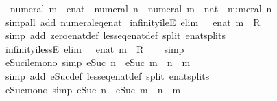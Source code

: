 \begin{isabellebody}
\ \ {\isachardoublequoteopen}{\isacharparenleft}numeral\ m\ {\isacharcolon}{\isacharcolon}\ enat{\isacharparenright}\ {\isacharless}\ numeral\ n\ {\isasymlongleftrightarrow}\ {\isacharparenleft}numeral\ m\ {\isacharcolon}{\isacharcolon}\ nat{\isacharparenright}\ {\isacharless}\ numeral\ n{\isachardoublequoteclose}\isanewline
%
\isadelimproof
\ \ %
\endisadelimproof
%
\isatagproof
{}\isamarkupfalse%
\ {\isacharparenleft}simp{\isacharunderscore}all\ add{\isacharcolon}\ numeral{\isacharunderscore}eq{\isacharunderscore}enat{\isacharparenright}%
\endisatagproof
{\isafoldproof}%
%
\isadelimproof
\isanewline
%
\endisadelimproof
\isanewline
{}\isamarkupfalse%
\ infinity{\isacharunderscore}ileE\ {\isacharbrackleft}elim{\isacharbang}{\isacharbrackright}{\isacharcolon}\ {\isachardoublequoteopen}{\isasyminfinity}\ {\isasymle}\ enat\ m\ {\isasymLongrightarrow}\ R{\isachardoublequoteclose}\isanewline
%
\isadelimproof
\ \ %
\endisadelimproof
%
\isatagproof
{}\isamarkupfalse%
\ {\isacharparenleft}simp\ add{\isacharcolon}\ zero{\isacharunderscore}enat{\isacharunderscore}def\ less{\isacharunderscore}eq{\isacharunderscore}enat{\isacharunderscore}def\ split{\isacharcolon}\ enat{\isachardot}splits{\isacharparenright}%
\endisatagproof
{\isafoldproof}%
%
\isadelimproof
\isanewline
%
\endisadelimproof
\isanewline
{}\isamarkupfalse%
\ infinity{\isacharunderscore}ilessE\ {\isacharbrackleft}elim{\isacharbang}{\isacharbrackright}{\isacharcolon}\ {\isachardoublequoteopen}{\isasyminfinity}\ {\isacharless}\ enat\ m\ {\isasymLongrightarrow}\ R{\isachardoublequoteclose}\isanewline
%
\isadelimproof
\ \ %
\endisadelimproof
%
\isatagproof
{}\isamarkupfalse%
\ simp%
\endisatagproof
{\isafoldproof}%
%
\isadelimproof
\isanewline
%
\endisadelimproof
\isanewline
{}\isamarkupfalse%
\ eSuc{\isacharunderscore}ile{\isacharunderscore}mono\ {\isacharbrackleft}simp{\isacharbrackright}{\isacharcolon}\ {\isachardoublequoteopen}eSuc\ n\ {\isasymle}\ eSuc\ m\ {\isasymlongleftrightarrow}\ n\ {\isasymle}\ m{\isachardoublequoteclose}\isanewline
%
\isadelimproof
\ \ %
\endisadelimproof
%
\isatagproof
{}\isamarkupfalse%
\ {\isacharparenleft}simp\ add{\isacharcolon}\ eSuc{\isacharunderscore}def\ less{\isacharunderscore}eq{\isacharunderscore}enat{\isacharunderscore}def\ split{\isacharcolon}\ enat{\isachardot}splits{\isacharparenright}%
\endisatagproof
{\isafoldproof}%
%
\isadelimproof
\isanewline
%
\endisadelimproof
\isanewline
{}\isamarkupfalse%
\ eSuc{\isacharunderscore}mono\ {\isacharbrackleft}simp{\isacharbrackright}{\isacharcolon}\ {\isachardoublequoteopen}eSuc\ n\ {\isacharless}\ eSuc\ m\ {\isasymlongleftrightarrow}\ n\ {\isacharless}\ m{\isachardoublequoteclose}\isanewline

\end{isabellebody}
